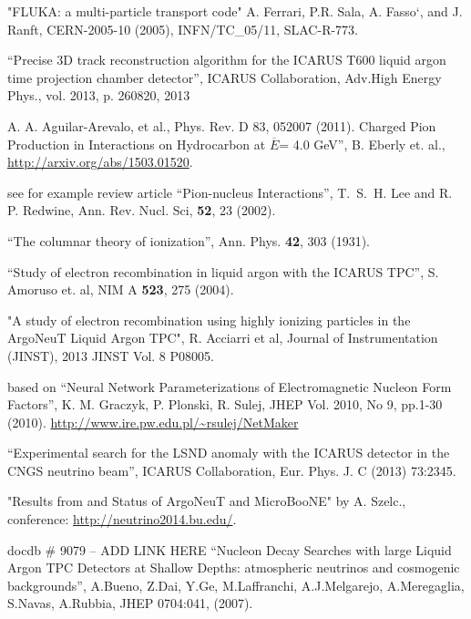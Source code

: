 \begin{thebibliography}{99}
 "FLUKA: a multi-particle transport code" A. Ferrari, P.R. Sala, A. Fasso`, and J. Ranft, CERN-2005-10 (2005), INFN/TC\_05/11, SLAC-R-773.

``Precise 3D track reconstruction algorithm for the ICARUS T600 liquid argon time projection chamber detector'', ICARUS Collaboration, 
Adv.High Energy Phys., vol. 2013, p. 260820, 2013

  A. A. Aguilar-Arevalo, et al.,
Phys. Rev. D 83, 052007 (2011).
 Charged Pion Production in Interactions on Hydrocarbon 
at $\overline{E}$= 4.0 GeV'', B. Eberly et. al., \url{http://arxiv.org/abs/1503.01520}.

 see for example review article ``Pion-nucleus Interactions'',
T.~S.~H. Lee and R. P. Redwine, Ann. Rev. Nucl. Sci,  {\bf 52}, 23 (2002).

 ``The columnar theory of ionization'', Ann. Phys. {\bf 42}, 303 (1931).

 ``Study of electron recombination in liquid argon with the ICARUS TPC'', S. Amoruso et. al, NIM A {\bf 523}, 275 (2004). 

 "A study of electron recombination using highly ionizing particles in the ArgoNeuT Liquid Argon TPC", 
R. Acciarri et al, Journal of Instrumentation 
(JINST), 2013 JINST Vol. 8 P08005.



 based on
``Neural Network Parameterizations of Electromagnetic Nucleon Form Factors'', K. M. Graczyk, P. Plonski, R. Sulej, JHEP Vol. 2010, No 9, pp.1-30 (2010).
\url{http://www.ire.pw.edu.pl/~rsulej/NetMaker}


 ``Experimental search for the LSND anomaly with the ICARUS
detector in the CNGS neutrino beam'', ICARUS Collaboration, Eur. Phys. J. C (2013) 73:2345.

 "Results from and Status of ArgoNeuT and MicroBooNE" by 
A. Szelc., conference: \url{http://neutrino2014.bu.edu/}.

 docdb \# 9079 -- ADD LINK HERE
``Nucleon Decay Searches with large Liquid Argon TPC Detectors at Shallow Depths: atmospheric neutrinos and cosmogenic backgrounds'', A.Bueno, Z.Dai, Y.Ge, M.Laffranchi, A.J.Melgarejo, A.Meregaglia, S.Navas, A.Rubbia, JHEP 0704:041, (2007).


\end{thebibliography}
